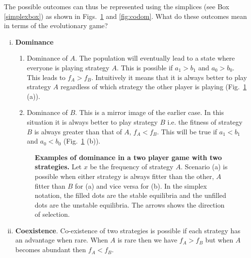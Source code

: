 \documentclass[oneside,11pt,a4paper]{book}
\begin{document}
The possible outcomes can thus be represented using the simplices (see Box \ref{simplexbox}) as shown in Figs.\ \ref{fig:dominance} and \ref{fig:codom}.
What do these outcomes mean in terms of the evolutionary game?

\begin{enumerate}[(i)]
\item \textbf{Dominance}
	\begin{enumerate}
	\item Dominance of $A$.
	The population will eventually lead to a state where everyone is playing strategy $A$.
	This is possible if $a_1>b_1$ and $a_0>b_0$.
	This leads to $f_A > f_B$.
	Intuitively it means that it is always better to play strategy $A$ regardless of which strategy the other player is playing (Fig.\ \ref{fig:dominance} (a)).
	\item Dominance of $B$.
	This is a mirror image of the earlier case.
	In this situation it is always better to play strategy $B$ i.e. the fitness of strategy $B$ is always greater than that of $A$, $f_A < f_B$.
	This will be true if $a_1<b_1$ and $a_0<b_0$ (Fig.\ \ref{fig:dominance} (b)).
	\end{enumerate}
\begin{figure}[!h]
  \begin{center}
  \end{center}
  \caption{
  \label{fig:dominance}
  \textbf{Examples of dominance in a two player game with two strategies.}
  \small{Let $x$ be the frequency of strategy $A$.
  Scenario (a) is possible when either strategy is always fitter than the other, $A$ fitter than $B$ for (a) and vice versa for (b).
In the simplex notation, the filled dots are the stable equilibria and the unfilled dots are the unstable equilibria.
The arrows shows the direction of selection.}
  }
\end{figure}
%
\item \textbf{Coexistence}. 
	Co-existence of two strategies is possible if each strategy has an advantage when rare.
	When $A$ is rare then we have $f_A > f_B$ but when $A$ becomes abundant then $f_A < f_B$.

\end{enumerate}
\end{document}
